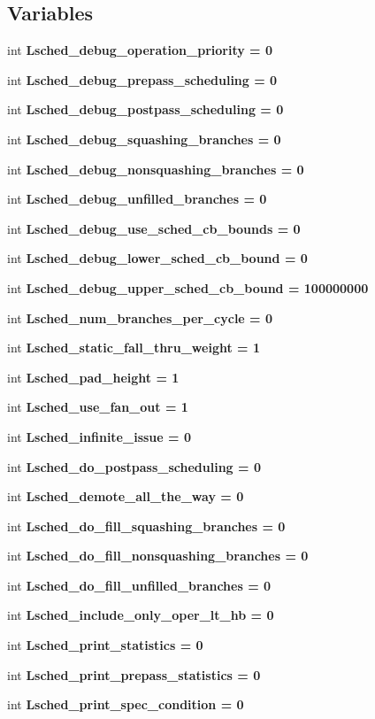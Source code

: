 \subsection*{Variables}
\begin{CompactItemize}
\item 
int \bf{Lsched\_\-debug\_\-operation\_\-priority} = 0
\item 
int \bf{Lsched\_\-debug\_\-prepass\_\-scheduling} = 0
\item 
int \bf{Lsched\_\-debug\_\-postpass\_\-scheduling} = 0
\item 
int \bf{Lsched\_\-debug\_\-squashing\_\-branches} = 0
\item 
int \bf{Lsched\_\-debug\_\-nonsquashing\_\-branches} = 0
\item 
int \bf{Lsched\_\-debug\_\-unfilled\_\-branches} = 0
\item 
int \bf{Lsched\_\-debug\_\-use\_\-sched\_\-cb\_\-bounds} = 0
\item 
int \bf{Lsched\_\-debug\_\-lower\_\-sched\_\-cb\_\-bound} = 0
\item 
int \bf{Lsched\_\-debug\_\-upper\_\-sched\_\-cb\_\-bound} = 100000000
\item 
int \bf{Lsched\_\-num\_\-branches\_\-per\_\-cycle} = 0
\item 
int \bf{Lsched\_\-static\_\-fall\_\-thru\_\-weight} = 1
\item 
int \bf{Lsched\_\-pad\_\-height} = 1
\item 
int \bf{Lsched\_\-use\_\-fan\_\-out} = 1
\item 
int \bf{Lsched\_\-infinite\_\-issue} = 0
\item 
int \bf{Lsched\_\-do\_\-postpass\_\-scheduling} = 0
\item 
int \bf{Lsched\_\-demote\_\-all\_\-the\_\-way} = 0
\item 
int \bf{Lsched\_\-do\_\-fill\_\-squashing\_\-branches} = 0
\item 
int \bf{Lsched\_\-do\_\-fill\_\-nonsquashing\_\-branches} = 0
\item 
int \bf{Lsched\_\-do\_\-fill\_\-unfilled\_\-branches} = 0
\item 
int \bf{Lsched\_\-include\_\-only\_\-oper\_\-lt\_\-hb} = 0
\item 
int \bf{Lsched\_\-print\_\-statistics} = 0
\item 
int \bf{Lsched\_\-print\_\-prepass\_\-statistics} = 0
\item 
int \bf{Lsched\_\-print\_\-spec\_\-condition} = 0
\item 

\end{CompactItemize}
